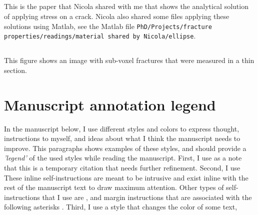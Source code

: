 \documentclass[12pt,titlepage]{article}
\begin{document}
\subsection{\cite{Maugis1992}}
This is the paper that Nicola shared with me that shows the analytical solution of applying stress on a crack. Nicola also shared some files applying these solutions using Matlab, see the Matlab file \texttt{PhD/Projects/fracture properties/readings/material shared by Nicola/ellipse}.
 
\subsection{\cite[see fig. 6]{Ketcham2001}} 
This figure shows an image with sub-voxel fractures that were measured in a thin section.
\clearpage
\newpage



\pagebreak
\appendix
{}
\section*{Manuscript annotation legend}
In the manuscript below, I use different styles and colors to express thought, instructions to myself, and ideas about what I think the manuscript needs to improve. This paragraphs shows examples of these styles, and should provide a \emph{'legend'} of the used styles while reading the manuscript. First, I use  as a note that this is a temporary citation that needs further refinement. Second, I use  These inline self-instructions are meant to be intrusive and exist inline with the rest of the manuscript text to draw maximum attention. Other types of self-instructions that I use are , and margin instructions that are associated with the following asterisks . Third, I use a style that changes the color of some text, 
\end{document}
